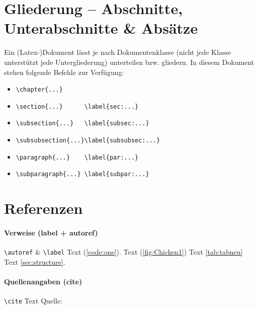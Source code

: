 \section{Gliederung -- Abschnitte, Unterabschnitte \& Absätze} \label{sec:structure}
Ein (Latex-)Dokument lässt je nach Dokumentenklasse (nicht jede Klasse unterstützt jede Untergliederung) unterteilen bzw. gliedern. In diesem Dokument stehen folgende Befehle zur Verfügung:
\begin{itemize}
	\item \verb|\chapter{...}|
	\item \verb|\section{...}      \label{sec:...}|
	\item \verb|\subsection{...}   \label{subsec:...}|
	\item \verb|\subsubsection{...}\label{subsubsec:...}|
	\item \verb|\paragraph{...}    \label{par:...}|
	\item \verb|\subparagraph{...} \label{subpar:...}|
\end{itemize}

\section{Referenzen}

\paragraph{Verweise (label + autoref)}
\verb|\autoref| \& \verb|\label| Text (\autoref{code:one}). Text (\autoref{fig:Chicken1}) Text \autoref{tab:tabneu} Text \autoref{sec:structure}.

\paragraph{Quellenangaben (cite)}
\verb|\cite| Text\cite{monk:2014:raspberry} Quelle: ~\cite{kofler:2015:raspberry}

